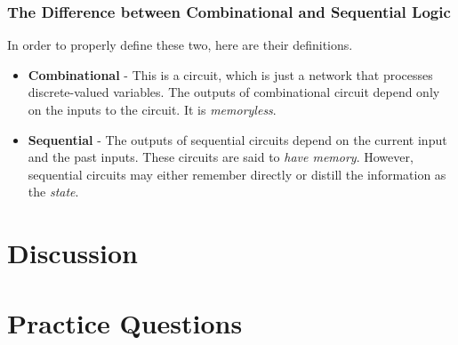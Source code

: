 \documentclass[12pt]{article}
\begin{document}
\subsubsection*{The Difference between Combinational and Sequential Logic}
In order to properly define these two, here are their definitions.
\begin{itemize}

	\item \textbf{Combinational} - This is a circuit, which is just a network that processes discrete-valued variables.
	      The outputs of combinational circuit depend only on the
	      inputs to the circuit. It is \textit{memoryless}.
	\item \textbf{Sequential} - The outputs of sequential circuits depend on the
	      current input and the past inputs. These circuits are said to \textit{have
		      memory}. However, sequential circuits may either remember directly or
	      distill the information as the \textit{state}.
	      
\end{itemize}

\section*{Discussion}

\section*{Practice Questions}
\end{document}
